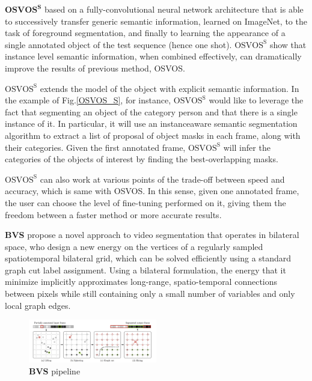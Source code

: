 $\textbf{OSVOS}^\textbf{S}$\cite{OSVOS-S} based on a fully-convolutional neural network architecture that is able to successively transfer generic semantic information, learned on ImageNet, to the task of foreground segmentation, and finally to learning the appearance of a single annotated object of the test sequence (hence one shot). $\text{OSVOS}^\text{S}$ show that instance level semantic information, when combined effectively, can dramatically improve the results of previous method, OSVOS\cite{OSVOS}.

$\text{OSVOS}^\text{S}$ extends the model of the object with explicit semantic information. In the example of Fig.\ref{OSVOS_S}, for instance, $\text{OSVOS}^\text{S}$ would like to leverage the fact that segmenting an object of the category person and that there is a single instance of it. In particular, it will use an instanceaware semantic segmentation algorithm to extract a list of proposal of object masks in each frame, along with their categories. Given the first annotated frame, $\text{OSVOS}^\text{S}$ will infer the categories of the objects of interest by finding the best-overlapping masks.

$\text{OSVOS}^\text{S}$ can also work at various points of the trade-off between speed and accuracy, which is same with OSVOS. In this sense, given one annotated frame, the user can choose the level of fine-tuning performed on it, giving them the freedom between a faster method or more accurate results.


\textbf{BVS}\cite{BVS} propose a novel approach to video segmentation that operates in bilateral space, who design a new energy on the vertices of a regularly sampled spatiotemporal bilateral grid, which can be solved efficiently using a standard graph cut label assignment. Using a bilateral formulation, the energy that it minimize implicitly approximates long-range, spatio-temporal connections between pixels while still containing only a small number of variables and only local graph edges. 

\begin{figure}[ht]
    \centering
    \includegraphics[width=0.5\textwidth]{./figure/BVS.png}
    \caption{\textbf{BVS} pipeline}
    \label{BVS}
\end{figure}

